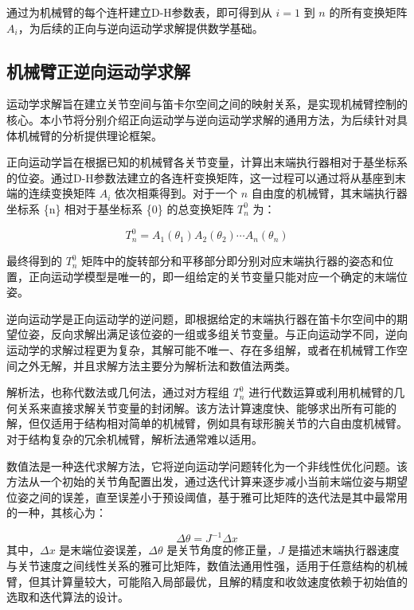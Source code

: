 通过为机械臂的每个连杆建立D-H参数表，即可得到从 $i=1$ 到 $n$ 的所有变换矩阵 $A_i$，为后续的正向与逆向运动学求解提供数学基础。


\subsection{机械臂正逆向运动学求解}
\label{subsec:fk_ik_solution}

运动学求解旨在建立关节空间与笛卡尔空间之间的映射关系，是实现机械臂控制的核心。本小节将分别介绍正向运动学与逆向运动学求解的通用方法，为后续针对具体机械臂的分析提供理论框架。

正向运动学旨在根据已知的机械臂各关节变量，计算出末端执行器相对于基坐标系的位姿。通过D-H参数法建立的各连杆变换矩阵，这一过程可以通过将从基座到末端的连续变换矩阵 $A_i$ 依次相乘得到。对于一个 $n$ 自由度的机械臂，其末端执行器坐标系 \{n\} 相对于基坐标系 \{0\} 的总变换矩阵 $T_n^0$ 为：

\begin{equation}
  \label{eq:forward_kinematics}
  T_n^0 = A_1(\theta_1) A_2(\theta_2) \cdots A_n(\theta_n)
\end{equation}

最终得到的 $T_n^0$ 矩阵中的旋转部分和平移部分即分别对应末端执行器的姿态和位置，正向运动学模型是唯一的，即一组给定的关节变量只能对应一个确定的末端位姿。

逆向运动学是正向运动学的逆问题，即根据给定的末端执行器在笛卡尔空间中的期望位姿，反向求解出满足该位姿的一组或多组关节变量。与正向运动学不同，逆向运动学的求解过程更为复杂，其解可能不唯一、存在多组解，或者在机械臂工作空间之外无解，并且求解方法主要分为解析法和数值法两类。

解析法，也称代数法或几何法，通过对方程组 $T_n^0$ 进行代数运算或利用机械臂的几何关系来直接求解关节变量的封闭解。该方法计算速度快、能够求出所有可能的解，但仅适用于结构相对简单的机械臂，例如具有球形腕关节的六自由度机械臂。对于结构复杂的冗余机械臂，解析法通常难以适用。

数值法是一种迭代求解方法，它将逆向运动学问题转化为一个非线性优化问题。该方法从一个初始的关节角配置出发，通过迭代计算来逐步减小当前末端位姿与期望位姿之间的误差，直至误差小于预设阈值，基于雅可比矩阵的迭代法是其中最常用的一种，其核心为：

\begin{equation}
  \label{eq:jacobian_inverse}
  \Delta\theta = J^{-1} \Delta x
\end{equation}
其中，$\Delta x$ 是末端位姿误差，$\Delta\theta$ 是关节角度的修正量，$J$ 是描述末端执行器速度与关节速度之间线性关系的雅可比矩阵，数值法通用性强，适用于任意结构的机械臂，但其计算量较大，可能陷入局部最优，且解的精度和收敛速度依赖于初始值的选取和迭代算法的设计。

